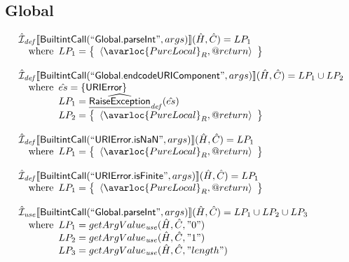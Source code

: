 \subsection{Global}
\[
\begin{array}{l}

\aI_{\it def}\lbr \SF{BuiltintCall}(``\SF{Global.parseInt}",args)\rbr(\hat{H},\hat{C})
  = LP_1\\
\quad\wherec{
  LP_1 = \set{\langle\avarloc{PureLocal}_R,\varprop{return}\rangle}\\
  }\\
\\
  
\aI_{\it def}\lbr \SF{BuiltintCall}(``\SF{Global.endcodeURIComponent}",args)\rbr(\hat{H},\hat{C})
  = LP_1 \cup LP_2\\
\quad\wherec{
  \hat{es} = \{ \SF{URIError} \}\\
  LP_1 = \ahf{RaiseException}_{\it def}(\hat{es})\\
  LP_2 = \set{\langle\avarloc{PureLocal}_R,\varprop{return}\rangle}\\
  }\\
\\

\aI_{\it def}\lbr \SF{BuiltintCall}(``\SF{URIError.isNaN}",args)\rbr(\hat{H},\hat{C})
  = LP_1\\
\quad\wherec{
  LP_1 = \set{\langle\avarloc{PureLocal}_R,\varprop{return}\rangle}\\
  }\\
\\

\aI_{\it def}\lbr \SF{BuiltintCall}(``\SF{URIError.isFinite}",args)\rbr(\hat{H},\hat{C})
  = LP_1\\
\quad\wherec{
  LP_1 = \set{\langle\avarloc{PureLocal}_R,\varprop{return}\rangle}\\
  }\\
\\


\aI_{\it use}\lbr \SF{BuiltintCall}(``\SF{Global.parseInt}",args)\rbr(\hat{H},\hat{C})
  = LP_1 \cup LP_2 \cup LP_3\\
\quad\wherec{
  LP_1 = getArgValue_{\it use}(\hat{H}, \hat{C}, "0")\\
  LP_2 = getArgValue_{\it use}(\hat{H}, \hat{C}, "1")\\
  LP_3 = getArgValue_{\it use}(\hat{H}, \hat{C}, "length")\\
  }\\
\\
  

\end{array}\]

